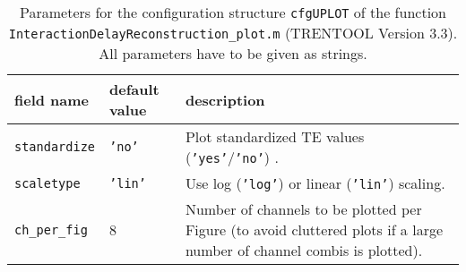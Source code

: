 \begin{table}[H]
\small \centering
\caption[Parameters \texttt{cfgUPLOT}]{Parameters for the configuration structure \texttt{cfgUPLOT} of the function \texttt{InteractionDelayReconstruction\_plot.m} (TRENTOOL Version 3.3). All parameters have to be given as strings.} 
\begin{tabularx}{\textwidth}{p{2cm}p{2cm}X} \toprule
\textbf{field name} & \textbf{default value} & \textbf{description} \\ \midrule
\verb+standardize+ & \texttt{'no'} & Plot standardized TE values (\texttt{'yes'}/\texttt{'no'}) .\\
\rowcolor{Gray}
\verb+scaletype+ & \texttt{'lin'} & Use log (\texttt{'log'}) or linear (\texttt{'lin'}) scaling.\\
\rowcolor{Gray}
\verb+ch_per_fig+ & 8 & Number of channels to be plotted per Figure (to avoid cluttered plots if a large number of channel combis is plotted).\\ \bottomrule
\end{tabularx} \label{tab:cfgUPLOT}
\end{table}